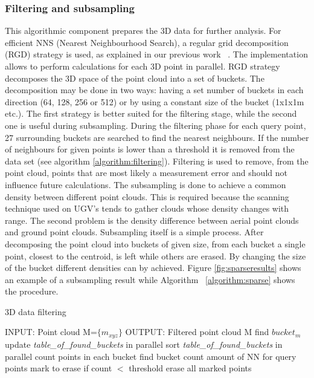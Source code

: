 \documentclass{article}
\begin{document}
\subsubsection{Filtering and subsampling}
This algorithmic component prepares the 3D data for further analysis.
For efficient NNS (Nearest Neighbourhood Search), a regular grid decomposition (RGD) strategy is used, as explained in our previous work ~\cite{Bedkowski2012}.
The implementation allows to perform calculations for each 3D point in parallel.
RGD strategy decomposes the 3D space of the point cloud into a set of buckets. The decomposition may be done in two ways: having a set number of buckets in each direction (64, 128, 256 or 512) or by using a constant size of the bucket (1x1x1m etc.).
The first strategy is better suited for the filtering stage, while the second one is useful during subsampling.
During the filtering phase for each query point, 27 surrounding buckets are searched to find the nearest neighbours.
If the number of neighbours for given points is lower than a threshold it is removed from the data set (see algorithm \ref{algorithm:filtering}).
Filtering is used to remove, from the point cloud, points that are most likely a measurement error and should not influence future calculations.
	The subsampling is done to achieve a common density between different point clouds.
This is required because the scanning technique used on UGV's tends to gather clouds whose density changes with range.
The second problem is the density difference between aerial point clouds and ground point clouds. Subsampling itself is a simple process.
After decomposing the point cloud into buckets of given size, from each bucket a single point, closest to the centroid, is left while others are erased.
By changing the size of the bucket different densities can by achieved.
Figure \ref{fig:sparseresults} shows an example of a subsampling result while Algorithm ~\ref{algorithm:sparse} shows the procedure.
\begin{algorithm}
\caption{3D data filtering}
\begin{algorithmic}
\label{algorithm:filtering}
\STATE INPUT: Point cloud M=$\{m_{xyz}\}$
\STATE OUTPUT: Filtered point cloud M
  \STATE find $bucket_m$
  \STATE update \textit{table\_of\_found\_buckets}
\ENDFOR
\STATE in parallel sort \textit{table\_of\_found\_buckets} 
\STATE in parallel count points in each bucket
  \STATE find bucket
    \STATE count amount of NN{ }for{ }query points
  \ENDFOR
  \STATE mark to erase if count $<$ threshold
\ENDFOR
\STATE erase all marked points
\end{algorithmic}
\end{algorithm}
\end{document}
